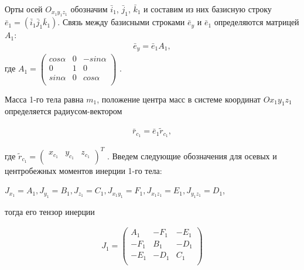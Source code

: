 \begin{enumerate}
	Орты осей $O_{x_1y_1z_1}$ обозначим $\bar{i}_1$, $\bar{j}_1$, $\bar{k}_1$ и составим из них базисную строку $\bar{e}_1 = (\bar{i}_1 \bar{j}_1 \bar{k}_1)$. Связь между базисными строками $\bar{e}_y$ и $\bar{e}_1$ определяются матрицей $A_1$:
	\begin{equation}
	\label{eq:p3:2}
	\begin{alignedat}{2}
	\bar{e}_y = \bar{e}_1	A_1,
	\end{alignedat}
	\end{equation}
	где \( A_{1}= \left( \begin{matrix}
	cos \alpha & 0 & -sin \alpha \\
	0 & 1 & 0\\
	sin \alpha & 0 & cos \alpha \\
	\end{matrix}
	\right) \) . 
	
	Масса 1-го тела равна \( m_{1} \), положение центра масс в системе координат \( Ox_{1}y_{1}z_{1} \) определяется радиусом-вектором 
	
	\begin{equation}
	\label{eq:p3:3}
	\begin{alignedat}{2}
	\bar{r}_{c_{1}}=\bar{e}_{1}\tilde{r}_{c_{1}},
	\end{alignedat}
	\end{equation}
	
	где \( \tilde{r}_{c_{1}}= \left( \begin{matrix}
	x_{c_{1}} & y_{c_{1}} & z_{c_{1}}\\
	\end{matrix}
	\right) ^{T} \) . 
	Введем следующие обозначения для осевых и центробежных моментов инерции 1-го тела: 
	
	\( J_{x_{1}}=A_{1},J_{y_{1}}=B_{1},J_{z_{1}}=C_{1},J_{x_{1}y_{1}}=F_{1},J_{x_{1}z_{1}}=E_{1},J_{y_{1}z_{1}}=D_{1} \), 
	
	тогда его тензор инерции 
	
	\begin{equation}
	\label{eq:p3:4}
	\begin{alignedat}{2}
	J_{1}= \left( \begin{matrix}
	A_{1} & -F_{1} & -E_{1}\\
	-F_{1} & B_{1} & -D_{1}\\
	-E_{1} & -D_{1} & C_{1}\\
	\end{matrix}
	\right) 
	\end{alignedat}
	\end{equation}
		

\end{enumerate}
